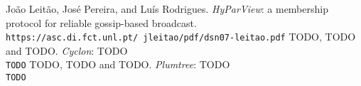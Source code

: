 

\begin{thebibliography}{9}

João Leitão, José Pereira, and Luís Rodrigues. 
\textit{HyParView}: a membership protocol for reliable gossip-based broadcast.
\\\texttt{https://asc.di.fct.unl.pt/~jleitao/pdf/dsn07-leitao.pdf}
TODO, TODO and TODO. 
\textit{Cyclon}: TODO
\\\texttt{TODO}
TODO, TODO and TODO. 
\textit{Plumtree}: TODO
\\\texttt{TODO}



\end{thebibliography}